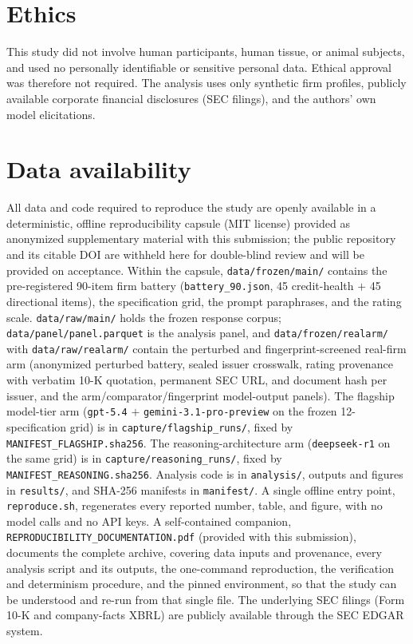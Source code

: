 \documentclass[a4paper,fleqn]{cas-sc}
\begin{document}
\section*{Ethics}
This study did not involve human participants, human tissue, or animal subjects, and used no personally
identifiable or sensitive personal data. Ethical approval was therefore not required. The analysis uses
only synthetic firm profiles, publicly available corporate financial disclosures (SEC filings), and the
authors' own model elicitations.

\section*{Data availability}
All data and code required to reproduce the study are openly available in a deterministic, offline
reproducibility capsule (MIT license) provided as anonymized supplementary material with this submission;
the public repository and its citable DOI are withheld here for double-blind review and will be provided
on acceptance.
Within the capsule, \texttt{data/frozen/main/} contains the pre-registered 90-item firm battery
(\texttt{battery\_90.json}, 45 credit-health $+$ 45 directional items), the specification grid, the prompt
paraphrases, and the rating scale. \texttt{data/raw/main/} holds the frozen
response corpus; \texttt{data/panel/panel.parquet} is the analysis panel, and
\texttt{data/frozen/realarm/} with \texttt{data/raw/realarm/} contain the perturbed and fingerprint-screened real-firm arm
(anonymized perturbed battery, sealed issuer crosswalk, rating provenance with verbatim 10-K quotation,
permanent SEC URL, and document hash per issuer, and the arm/comparator/fingerprint model-output panels).
The flagship model-tier arm (\texttt{gpt-5.4} $+$ \texttt{gemini-3.1-pro-preview} on the frozen
12-specification grid) is in \texttt{capture/flagship\_runs/}, fixed by \texttt{MANIFEST\_FLAGSHIP.sha256}.
The reasoning-architecture arm (\texttt{deepseek-r1} on the same grid) is in \texttt{capture/reasoning\_runs/},
fixed by \texttt{MANIFEST\_REASONING.sha256}.
Analysis code is in \texttt{analysis/}, outputs and figures in \texttt{results/}, and SHA-256 manifests in
\texttt{manifest/}. A single offline entry point, \texttt{reproduce.sh}, regenerates every reported
number, table, and figure, with no model calls and no API keys. A self-contained companion,
\texttt{REPRODUCIBILITY\_DOCUMENTATION.pdf} (provided with this submission), documents the
complete archive, covering data inputs and provenance, every analysis script and its outputs, the one-command
reproduction, the verification and determinism procedure, and the pinned environment, so that the study
can be understood and re-run from that single file. The underlying SEC filings (Form 10-K and
company-facts XBRL) are publicly available through the SEC EDGAR system.



\end{document}
